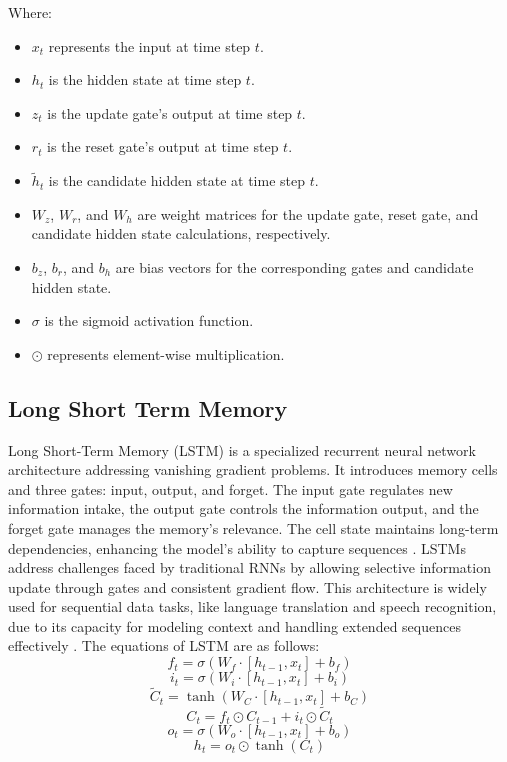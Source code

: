 \documentclass[sn-mathphys,Numbered]{sn-jnl}
\theoremstyle{thmstyleone}
\theoremstyle{thmstyletwo}
\theoremstyle{thmstylethree}
\begin{document}
Where:
\begin{itemize}
\item \(x_t\) represents the input at time step \(t\).
\item \(h_t\) is the hidden state at time step \(t\).
\item \(z_t\) is the update gate's output at time step \(t\).
\item \(r_t\) is the reset gate's output at time step \(t\).
\item \(\tilde{h}_t\) is the candidate hidden state at time step \(t\).
\item \(W_z\), \(W_r\), and \(W_h\) are weight matrices for the update gate, reset gate, and candidate hidden state calculations, respectively.
\item \(b_z\), \(b_r\), and \(b_h\) are bias vectors for the corresponding gates and candidate hidden state.
\item \(\sigma\) is the sigmoid activation function.
\item \(\odot\) represents element-wise multiplication.
\end{itemize}

\subsection{Long Short Term Memory}
Long Short-Term Memory (LSTM) is a specialized recurrent neural network architecture addressing vanishing gradient problems. It introduces memory cells and three gates: input, output, and forget. The input gate regulates new information intake, the output gate controls the information output, and the forget gate manages the memory's relevance. The cell state maintains long-term dependencies, enhancing the model's ability to capture sequences \cite{guillen2020deep}. LSTMs address challenges faced by traditional RNNs by allowing selective information update through gates and consistent gradient flow. This architecture is widely used for sequential data tasks, like language translation and speech recognition, due to its capacity for modeling context and handling extended sequences effectively \cite{qiu2021river}. The equations of LSTM are as follows:
\begin{equation}
f_t = \sigma(W_f \cdot [h_{t-1}, x_t] + b_f)
\end{equation}
\begin{equation}
i_t = \sigma(W_i \cdot [h_{t-1}, x_t] + b_i)
\end{equation}
\begin{equation}
\tilde{C}_t = \tanh(W_C \cdot [h_{t-1}, x_t] + b_C)
\end{equation}
\begin{equation}
C_t = f_t \odot C_{t-1} + i_t \odot \tilde{C}_t
\end{equation}
\begin{equation}
o_t = \sigma(W_o \cdot [h_{t-1}, x_t] + b_o)
\end{equation}
\begin{equation}
h_t = o_t \odot \tanh(C_t)
\end{equation}
\end{document}
